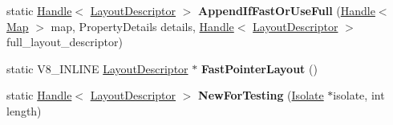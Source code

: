 \begin{DoxyCompactItemize}
\item 
static \hyperlink{classv8_1_1internal_1_1_handle}{Handle}$<$ \hyperlink{classv8_1_1internal_1_1_layout_descriptor}{Layout\+Descriptor} $>$ {\bfseries Append\+If\+Fast\+Or\+Use\+Full} (\hyperlink{classv8_1_1internal_1_1_handle}{Handle}$<$ \hyperlink{classv8_1_1internal_1_1_map}{Map} $>$ map, Property\+Details details, \hyperlink{classv8_1_1internal_1_1_handle}{Handle}$<$ \hyperlink{classv8_1_1internal_1_1_layout_descriptor}{Layout\+Descriptor} $>$ full\+\_\+layout\+\_\+descriptor)\hypertarget{classv8_1_1internal_1_1_layout_descriptor_a5c6508973f7fcd60fcfbc6576804f189}{}\label{classv8_1_1internal_1_1_layout_descriptor_a5c6508973f7fcd60fcfbc6576804f189}

\item 
static V8\+\_\+\+I\+N\+L\+I\+NE \hyperlink{classv8_1_1internal_1_1_layout_descriptor}{Layout\+Descriptor} $\ast$ {\bfseries Fast\+Pointer\+Layout} ()\hypertarget{classv8_1_1internal_1_1_layout_descriptor_a5e49b3de62f749b0b5624f66ebc86483}{}\label{classv8_1_1internal_1_1_layout_descriptor_a5e49b3de62f749b0b5624f66ebc86483}

\item 
static \hyperlink{classv8_1_1internal_1_1_handle}{Handle}$<$ \hyperlink{classv8_1_1internal_1_1_layout_descriptor}{Layout\+Descriptor} $>$ {\bfseries New\+For\+Testing} (\hyperlink{classv8_1_1internal_1_1_isolate}{Isolate} $\ast$isolate, int length)\hypertarget{classv8_1_1internal_1_1_layout_descriptor_af10658d304188d0f37b679f2a4596c2e}{}\label{classv8_1_1internal_1_1_layout_descriptor_af10658d304188d0f37b679f2a4596c2e}

\end{DoxyCompactItemize}
